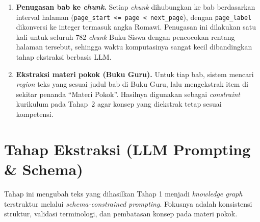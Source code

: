 \documentclass[../../thesis]{subfiles}
\begin{document}
\begin{enumerate}
  \item \textbf{Penugasan bab ke \textit{chunk}.} Setiap \textit{chunk}
        dihubungkan ke bab berdasarkan interval halaman
        (\texttt{page\_start <= page < next\_page}), dengan \texttt{page\_label}
        dikonversi ke integer termasuk angka Romawi. Penugasan ini dilakukan satu
        kali untuk seluruh 782 \textit{chunk} Buku Siswa dengan pencocokan rentang halaman
        tersebut, sehingga waktu komputasinya sangat kecil dibandingkan tahap
        ekstraksi berbasis LLM.

  \item \textbf{Ekstraksi materi pokok (Buku Guru).} Untuk tiap bab, sistem
        mencari \textit{region} teks yang sesuai judul bab di Buku Guru, lalu
        mengekstrak item di sekitar penanda ``Materi Pokok''. Hasilnya
        digunakan sebagai \textit{constraint} kurikulum pada Tahap~2 agar konsep
        yang diekstrak tetap sesuai kompetensi.
\end{enumerate}

\section{Tahap Ekstraksi (LLM Prompting \& Schema)}\label{sec:ekstraksi}

Tahap ini mengubah teks yang dihasilkan Tahap 1 menjadi \textit{knowledge
graph} terstruktur melalui \textit{schema-constrained prompting}.
Fokusnya adalah konsistensi struktur, validasi terminologi, dan
pembatasan konsep pada materi pokok.
\end{document}
